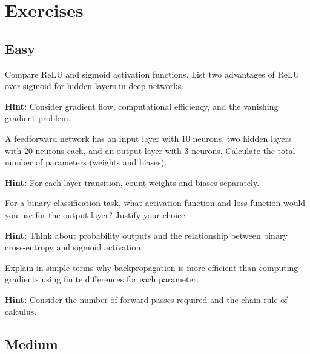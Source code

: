 
\section*{Exercises}

\subsection*{Easy}

\begin{problem}
Compare ReLU and sigmoid activation functions. List two advantages of ReLU over sigmoid for hidden layers in deep networks.

\textbf{Hint:} Consider gradient flow, computational efficiency, and the vanishing gradient problem.
\end{problem}

\begin{problem}
A feedforward network has an input layer with 10 neurons, two hidden layers with 20 neurons each, and an output layer with 3 neurons. Calculate the total number of parameters (weights and biases).

\textbf{Hint:} For each layer transition, count weights and biases separately.
\end{problem}

\begin{problem}
For a binary classification task, what activation function and loss function would you use for the output layer? Justify your choice.

\textbf{Hint:} Think about probability outputs and the relationship between binary cross-entropy and sigmoid activation.
\end{problem}

\begin{problem}
Explain in simple terms why backpropagation is more efficient than computing gradients using finite differences for each parameter.

\textbf{Hint:} Consider the number of forward passes required and the chain rule of calculus.
\end{problem}

\subsection*{Medium}

